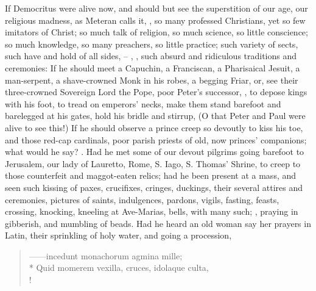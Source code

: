 If Democritus were alive now, and should but see the superstition of our age,
our religious madness, as Meteran calls
it, , so many professed Christians, yet so few
imitators of Christ; so much talk of religion, so much science, so little
conscience; so much knowledge, so many preachers, so little practice; such
variety of sects, such have and hold of all sides, --
, \etc{}, such absurd and ridiculous traditions and
ceremonies: If he should meet a Capuchin, a Franciscan, a
Pharisaical Jesuit, a man-serpent, a shave-crowned Monk in his robes, a begging
Friar, or, see their three-crowned Sovereign Lord the Pope, poor Peter's
successor, , to depose kings with his foot, to tread on
emperors' necks, make them stand barefoot and barelegged at his gates, hold his
bridle and stirrup, \etc{} (O that Peter and Paul were alive to see this!) If
he should observe a prince creep so devoutly to kiss his
toe, and those red-cap cardinals, poor parish priests of old, now princes'
companions; what would he say? . Had he met
some of our devout pilgrims going barefoot to Jerusalem, our lady of Lauretto,
Rome, S. Iago, S. Thomas' Shrine, to creep to those counterfeit and
maggot-eaten relics; had he been present at a mass, and seen such kissing of
paxes, crucifixes, cringes, duckings, their several attires and ceremonies,
pictures of saints, indulgences, pardons, vigils, fasting,
feasts, crossing, knocking, kneeling at Ave-Marias, bells, with many such;
, praying in
gibberish, and mumbling of beads. Had he heard an old woman say her prayers in
Latin, their sprinkling of holy water, and going a procession,

\begin{latin}
\begin{verse}%
------incedunt monachorum agmina mille;\\*
Quid momerem vexilla, cruces, idolaque culta, \etc{}\\!
\end{verse}%
\end{latin}

